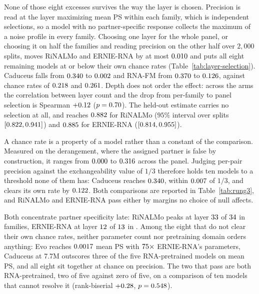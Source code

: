\documentclass[11pt]{article}
\begin{document}
None of those eight excesses survives the way the layer is chosen. Precision is
read at the layer maximizing mean PS within each family, which is
\chanceRateN{} independent selections, so a model with no partner-specific
response collects the maximum of a noise profile in every family. Choosing one
layer for the whole panel, or choosing it on half the families and reading
precision on the other half over $2{,}000$ splits, moves RiNALMo and ERNIE-RNA
by at most $0.010{}$ and puts all eight remaining models at or
below their own
chance rates (Table~\ref{tab:layer-selection}). Caduceus falls from
$0.340{}$ to $0.002{}$ and RNA-FM from
$0.370{}$ to $0.126{}$, against chance rates of
$0.218{}$ and $0.261{}$. Depth does not order the effect: across the \selectionArms{} arms the
correlation between layer count and the drop from per-family to panel selection
is Spearman $+0.12{}$ ($p = 0.70{}$). The held-out
estimate carries no selection at all, and reaches $0.882{}$ for
RiNALMo ($95\%$ interval over splits $[0.822, 0.941]{}$) and
$0.885{}$ for ERNIE-RNA ($[0.814, 0.955]{}$).



A chance rate is a property of a model rather than a constant of the comparison.
Measured on the derangement, where the assigned partner is false by
construction, it ranges from $0.000{}$ to $0.316{}$ across
the panel. Judging
per-pair precision against the exchangeability value of $1/3$ therefore holds
ten models to a threshold none of them has: Caduceus reaches
$0.340{}$, within $0.007{}$ of $1/3$, and clears
its own rate by $0.122{}$. Both comparisons are
reported in Table~\ref{tab:rung3}, and RiNALMo and ERNIE-RNA pass either by
margins no choice of null affects.

Both concentrate partner specificity late: RiNALMo peaks at layer
$33{}$ of $34{}$ in \psPeakCountRiNALMo{} families,
ERNIE-RNA at layer $12{}$ of $13{}$ in
\psPeakCountErnieRNA{}. Among the eight that do not clear their own chance
rates, neither parameter count nor pretraining domain orders anything: Evo
reaches $0.0017{}$ mean PS with $75{}\times$ ERNIE-RNA's parameters, Caduceus at
7.7M outscores three of the five RNA-pretrained models on mean PS, and all eight
sit together at chance on precision. The two that pass are both
RNA-pretrained, two of five against zero of five, on a comparison of ten models
that cannot resolve it (rank-biserial $+0.28{}$,
$p = 0.548{}$).
\end{document}
